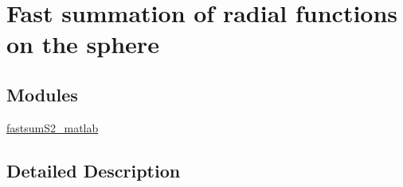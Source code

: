 \hypertarget{group__applications__fastsumS2}{\section{Fast summation of radial functions on the sphere}
\label{group__applications__fastsumS2}
}
\subsection*{Modules}
\begin{DoxyCompactItemize}
\item 
\hyperlink{group__applications__fastsumS2__test}{fastsum\-S2\-\_\-matlab}
\end{DoxyCompactItemize}


\subsection{Detailed Description}
